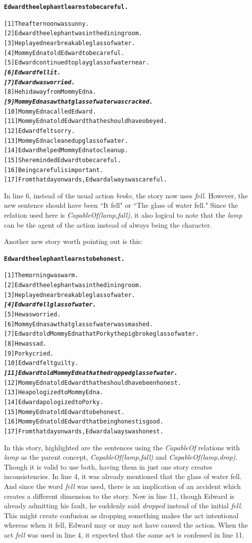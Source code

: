 \begin{alltt}
\textbf{Edward the elephant learns to be careful.}

[1]  The afternoon was sunny.
[2]  Edward the elephant was in the dining room.
[3]  He played near breakable glass of water.
[4]  Mommy Edna told Edward to be careful.
[5]  Edward continued to play glass of water near.
\emph{\textbf{[6]  Edward fell it.}}
\emph{\textbf{[7]  Edward was worried.}}
[8]  He hid away from Mommy Edna.
\emph{\textbf{[9]  Mommy Edna saw that glass of water was cracked.}}
[10] Mommy Edna called Edward.
[11] Mommy Edna told Edward that he should have obeyed.
[12] Edward felt sorry.
[13] Mommy Edna cleaned up glass of water.
[14] Edward helped Mommy Edna to clean up.
[15] She reminded Edward to be careful.
[16] Being careful is important.
[17] From that day onwards, Edward always was careful.
\end{alltt}

In line 6, instead of the usual action \textit{broke}, the story now uses \textit{fell}. However, the new sentence should have been ``It fell" or ``The glass of water fell." Since the relation used here is \textit{CapableOf(lamp,fall)}, it also logical to note that the \textit{lamp} can be the agent of the action instead of always being the character. 

Another new story worth pointing out is this:

\begin{alltt}
\textbf{Edward the elephant learns to be honest.}

[1]  The morning was warm.
[2]  Edward the elephant was in the dining room.
[3]  He played near breakable glass of water.
\emph{\textbf{[4]  Edward fell glass of water.}}
[5]  He was worried.
[6]  Mommy Edna saw that glass of water was smashed.
[7]  Edward told Mommy Edna that Porky the pig broke glass of water.
[8]  He was sad.
[9]  Porky cried.
[10] Edward felt guilty.
\emph{\textbf{[11] Edward told Mommy Edna that he dropped glass of water.}}
[12] Mommy Edna told Edward that he should have been honest.
[13] He apologized to Mommy Edna.
[14] Edward apologized to Porky.
[15] Mommy Edna told Edward to be honest.
[16] Mommy Edna told Edward that being honest is good.
[17] From that day onwards, Edward always was honest.
\end{alltt}

In this story, highlighted are the sentences using the \textit{CapableOf} relations with \textit{lamp} as the parent concept, \textit{CapableOf(lamp,fall)} and \textit{CapableOf(lamp,drop)}. Though it is valid to use both, having them in just one story creates inconsistencies. In line 4, it was already mentioned that the glass of water fell. And since the word \textit{fell} was used, there is an implication of an accident which creates a different dimension to the story. Now in line 11, though Edward is already admitting his fault, he suddenly said \textit{dropped} instead of the initial \textit{fell}. This might create confusion as dropping something makes the act intentional whereas when it fell, Edward may or may not have caused the action. When the act \textit{fell} was used in line 4, it expected that the same act is confessed in line 11.

